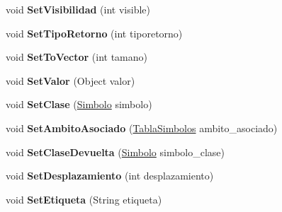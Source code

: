 \begin{DoxyCompactItemize}
\item 
\hypertarget{classcompilationunit_1_1_simbolo_a7492a59393c953a1dbe36892a947f963}{
void {\bfseries SetVisibilidad} (int visible)}
\label{classcompilationunit_1_1_simbolo_a7492a59393c953a1dbe36892a947f963}

\item 
\hypertarget{classcompilationunit_1_1_simbolo_a43e2f53555d992ef8546e6fbf0be2811}{
void {\bfseries SetTipoRetorno} (int tiporetorno)}
\label{classcompilationunit_1_1_simbolo_a43e2f53555d992ef8546e6fbf0be2811}

\item 
\hypertarget{classcompilationunit_1_1_simbolo_a87113d946c2127a7a7a23377ae6f562c}{
void {\bfseries SetToVector} (int tamano)}
\label{classcompilationunit_1_1_simbolo_a87113d946c2127a7a7a23377ae6f562c}

\item 
\hypertarget{classcompilationunit_1_1_simbolo_a8989db5deb35ce1fb348efe43e354c5e}{
void {\bfseries SetValor} (Object valor)}
\label{classcompilationunit_1_1_simbolo_a8989db5deb35ce1fb348efe43e354c5e}

\item 
\hypertarget{classcompilationunit_1_1_simbolo_ac26e8979d8a864966292511a095f8e65}{
void {\bfseries SetClase} (\hyperlink{classcompilationunit_1_1_simbolo}{Simbolo} simbolo)}
\label{classcompilationunit_1_1_simbolo_ac26e8979d8a864966292511a095f8e65}

\item 
\hypertarget{classcompilationunit_1_1_simbolo_ad6ebacbd77a0e48ce64a762d9830780e}{
void {\bfseries SetAmbitoAsociado} (\hyperlink{classcompilationunit_1_1_tabla_simbolos}{TablaSimbolos} ambito\_\-asociado)}
\label{classcompilationunit_1_1_simbolo_ad6ebacbd77a0e48ce64a762d9830780e}

\item 
\hypertarget{classcompilationunit_1_1_simbolo_a420bc9260b062f70667a3a42a7b6b762}{
void {\bfseries SetClaseDevuelta} (\hyperlink{classcompilationunit_1_1_simbolo}{Simbolo} simbolo\_\-clase)}
\label{classcompilationunit_1_1_simbolo_a420bc9260b062f70667a3a42a7b6b762}

\item 
\hypertarget{classcompilationunit_1_1_simbolo_aa2b88742b474aebac35721ac02a8067e}{
void {\bfseries SetDesplazamiento} (int desplazamiento)}
\label{classcompilationunit_1_1_simbolo_aa2b88742b474aebac35721ac02a8067e}

\item 
\hypertarget{classcompilationunit_1_1_simbolo_a2536b2a6da0e98ea640231a9306792d2}{
void {\bfseries SetEtiqueta} (String etiqueta)}
\label{classcompilationunit_1_1_simbolo_a2536b2a6da0e98ea640231a9306792d2}


\end{DoxyCompactItemize}
